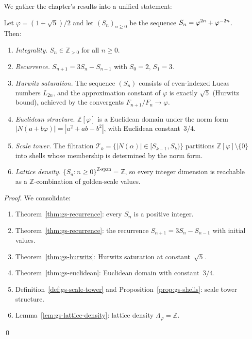 We gather the chapter's results into a unified statement:

\begin{theorem}\label{thm:gs-main}
Let \(\varphi = (1+\sqrt{5})/2\) and let
\((S_n)_{n \ge 0}\) be the sequence \(S_n = \varphi^{2n} + \varphi^{-2n}\).
Then:
\begin{enumerate}[label=\upshape(\roman*)]
  \item \emph{Integrality.} \(S_n \in \mathbb{Z}_{>0}\) for all \(n \ge 0\).
  \item \emph{Recurrence.} \(S_{n+1} = 3S_n - S_{n-1}\) with \(S_0 = 2\),
        \(S_1 = 3\).
  \item \emph{Hurwitz saturation.} The sequence \((S_n)\) consists
        of even-indexed Lucas numbers \(L_{2n}\), and the
        approximation constant of \(\varphi\) is exactly \(\sqrt{5}\)
        (Hurwitz bound), achieved by the convergents \(F_{n+1}/F_n
        \to \varphi\).
  \item \emph{Euclidean structure.} \(\mathbb{Z}[\varphi]\) is a
        Euclidean domain under the norm form \(|N(a+b\varphi)| =
        |a^2+ab-b^2|\), with Euclidean constant~\(3/4\).
  \item \emph{Scale tower.} The filtration \(\mathcal{T}_k =
        \{|N(\alpha)| \in [S_{k-1}, S_k)\}\) partitions
        \(\mathbb{Z}[\varphi] \setminus \{0\}\) into shells whose
        membership is determined by the norm form.
  \item \emph{Lattice density.} \(\{S_n : n \ge 0\}^{\mathbb{Z}\text{-span}}
        = \mathbb{Z}\), so every integer dimension is reachable as
        a \(\mathbb{Z}\)-combination of golden-scale values.
\end{enumerate}
\end{theorem}

\begin{proof}
We consolidate:
\begin{enumerate}[label=\upshape(\roman*)]
  \item Theorem~\ref{thm:gs-recurrence}: every \(S_n\) is a positive
        integer.
  \item Theorem~\ref{thm:gs-recurrence}: the recurrence
        \(S_{n+1} = 3S_n - S_{n-1}\) with initial values.
  \item Theorem~\ref{thm:gs-hurwitz}: Hurwitz saturation at
        constant~\(\sqrt{5}\).
  \item Theorem~\ref{thm:gs-euclidean}: Euclidean domain
        with constant~\(3/4\).
  \item Definition~\ref{def:gs-scale-tower} and
        Proposition~\ref{prop:gs-shells}: scale tower structure.
  \item Lemma~\ref{lem:gs-lattice-density}: lattice density
        \(\Lambda_\varphi = \mathbb{Z}\).
\end{enumerate}
\qed
\end{proof}


